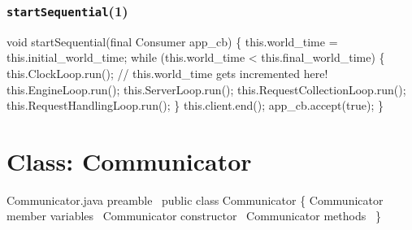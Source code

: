 \subsection{{\tt{}\protect{}startSequential}(1)}
\nwenddocs{}\endmoddef{}
void startSequential(final Consumer app_cb) \{
  this.world_time = this.initial_world_time;
  while (this.world_time < this.final_world_time) \{
    this.ClockLoop.run();  // this.world_time gets incremented here!
    this.EngineLoop.run();
    this.ServerLoop.run();
    this.RequestCollectionLoop.run();
    this.RequestHandlingLoop.run();
  \}
  this.client.end();
  app_cb.accept(true);
\}
\eatline
{}\nwendcode{}\nwdocspar
























\nwenddocs{}\chapter{Class: Communicator}
\label{communicator}

\nwenddocs{}\endmoddef{}
\LA{}Communicator.java preamble~{\nwtagstyle{}}\RA{}
public class Communicator \{
  \LA{}\code{}Communicator\edoc{} member variables~{\nwtagstyle{}}\RA{}
  \LA{}\code{}Communicator\edoc{} constructor~{\nwtagstyle{}}\RA{}
  \LA{}\code{}Communicator\edoc{} methods~{\nwtagstyle{}}\RA{}
\}
\nwendcode{}\nwdocspar


